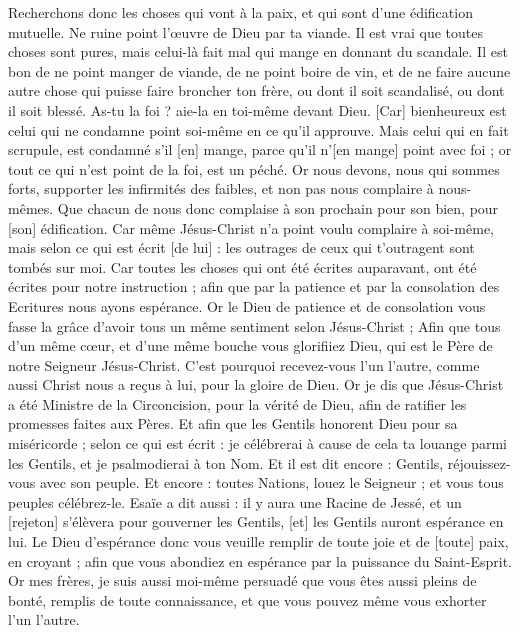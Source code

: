\begin{multicols}{2}
Recherchons donc les choses qui vont à la paix, et qui sont d'une édification mutuelle.
Ne ruine point l'œuvre de Dieu par ta viande. Il est vrai que toutes choses sont pures, mais celui-là fait mal qui mange en donnant du scandale.
Il est bon de ne point manger de viande, de ne point boire de vin, et de ne faire aucune autre chose qui puisse faire broncher ton frère, ou dont il soit scandalisé, ou dont il soit blessé.
As-tu la foi ? aie-la en toi-même devant Dieu. [Car] bienheureux est celui qui ne condamne point soi-même en ce qu'il approuve.
Mais celui qui en fait scrupule, est condamné s'il [en] mange, parce qu'il n'[en mange] point avec foi ; or tout ce qui n'est point de la foi, est un péché.
\VerseOne{}Or nous devons, nous qui sommes forts, supporter les infirmités des faibles, et non pas nous complaire à nous-mêmes.
Que chacun de nous donc complaise à son prochain pour son bien, pour [son] édification.
Car même Jésus-Christ n'a point voulu complaire à soi-même, mais selon ce qui est écrit [de lui] : les outrages de ceux qui t'outragent sont tombés sur moi.
Car toutes les choses qui ont été écrites auparavant, ont été écrites pour notre instruction ; afin que par la patience et par la consolation des Ecritures nous ayons espérance.
Or le Dieu de patience et de consolation vous fasse la grâce d'avoir tous un même sentiment selon Jésus-Christ ;
Afin que tous d'un même cœur, et d'une même bouche vous glorifiiez Dieu, qui est le Père de notre Seigneur Jésus-Christ.
C'est pourquoi recevez-vous l'un l'autre, comme aussi Christ nous a reçus à lui, pour la gloire de Dieu.
Or je dis que Jésus-Christ a été Ministre de la Circoncision, pour la vérité de Dieu, afin de ratifier les promesses faites aux Pères.
Et afin que les Gentils honorent Dieu pour sa miséricorde ; selon ce qui est écrit : je célébrerai à cause de cela ta louange parmi les Gentils, et je psalmodierai à ton Nom.
Et il est dit encore : Gentils, réjouissez-vous avec son peuple.
Et encore : toutes Nations, louez le Seigneur ; et vous tous peuples célébrez-le.
Esaïe a dit aussi : il y aura une Racine de Jessé, et un [rejeton] s'élèvera pour gouverner les Gentils, [et] les Gentils auront espérance en lui.
Le Dieu d'espérance donc vous veuille remplir de toute joie et de [toute] paix, en croyant ; afin que vous abondiez en espérance par la puissance du Saint-Esprit.
Or mes frères, je suis aussi moi-même persuadé que vous êtes aussi pleins de bonté, remplis de toute connaissance, et que vous pouvez même vous exhorter l'un l'autre.

\end{multicols}
